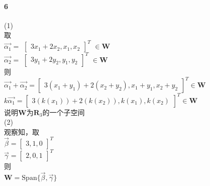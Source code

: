 \documentclass{ctexart}
\begin{document}
    \paragraph{6}
    \begin{mdframed}
        (1)\\
        取\\
        $\vec{\alpha_1}=$
        $\begin{bmatrix}
            3x_1+2x_2,x_1,x_2
        \end{bmatrix}^{T}$
        $\in \mathbf{W}$\\
        $\vec{\alpha_2}=$
        $\begin{bmatrix}
            3y_1+2y_2,y_1,y_2
        \end{bmatrix}^{T}$
        $\in \mathbf{W}$\\
        则\\
        $\vec{\alpha_1}+\vec{\alpha_2}=
        \begin{bmatrix}
            3(x_1+y_1)+2(x_2+y_2),x_1+y_1,x_2+y_2
        \end{bmatrix}^{T}
        \in \mathbf{W}$\\
        $k\vec{\alpha_1}=
        \begin{bmatrix}
            3(k(x_1))+2(k(x_2)),k(x_1),k(x_2)
        \end{bmatrix}^{T}
        \in \mathbf{W}$\\
        说明$\mathbf{W}$为$\mathbf{R}_3$的一个子空间\\
        (2)\\
        观察知，取\\
        $\vec{\beta}=
        \begin{bmatrix}
            3,1,0
        \end{bmatrix}^{T}$\\
        $\vec{\gamma}=
        \begin{bmatrix}
            2,0,1
        \end{bmatrix}^{T}$\\
        则\\
        $\mathbf{W} = \text{Span}\{\vec{\beta}, \vec{\gamma}\}$
    \end{mdframed}
\end{document}
